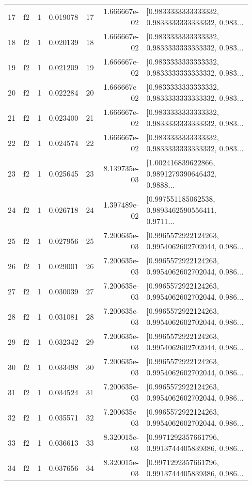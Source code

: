 \begin{tabular}{lllrlrl}
17  &  f2 &   1 &  0.019078 &   17 &  1.666667e-02 &  [0.9833333333333332, 0.9833333333333332, 0.983... \\
18  &  f2 &   1 &  0.020139 &   18 &  1.666667e-02 &  [0.9833333333333332, 0.9833333333333332, 0.983... \\
19  &  f2 &   1 &  0.021209 &   19 &  1.666667e-02 &  [0.9833333333333332, 0.9833333333333332, 0.983... \\
20  &  f2 &   1 &  0.022284 &   20 &  1.666667e-02 &  [0.9833333333333332, 0.9833333333333332, 0.983... \\
21  &  f2 &   1 &  0.023400 &   21 &  1.666667e-02 &  [0.9833333333333332, 0.9833333333333332, 0.983... \\
22  &  f2 &   1 &  0.024574 &   22 &  1.666667e-02 &  [0.9833333333333332, 0.9833333333333332, 0.983... \\
23  &  f2 &   1 &  0.025645 &   23 &  8.139735e-03 &  [1.002416839622866, 0.9891279390646432, 0.9888... \\
24  &  f2 &   1 &  0.026718 &   24 &  1.397489e-02 &  [0.997551185062538, 0.9893462590556411, 0.9711... \\
25  &  f2 &   1 &  0.027956 &   25 &  7.200635e-03 &  [0.9965572922124263, 0.9954062602702044, 0.986... \\
26  &  f2 &   1 &  0.029001 &   26 &  7.200635e-03 &  [0.9965572922124263, 0.9954062602702044, 0.986... \\
27  &  f2 &   1 &  0.030039 &   27 &  7.200635e-03 &  [0.9965572922124263, 0.9954062602702044, 0.986... \\
28  &  f2 &   1 &  0.031081 &   28 &  7.200635e-03 &  [0.9965572922124263, 0.9954062602702044, 0.986... \\
29  &  f2 &   1 &  0.032342 &   29 &  7.200635e-03 &  [0.9965572922124263, 0.9954062602702044, 0.986... \\
30  &  f2 &   1 &  0.033498 &   30 &  7.200635e-03 &  [0.9965572922124263, 0.9954062602702044, 0.986... \\
31  &  f2 &   1 &  0.034524 &   31 &  7.200635e-03 &  [0.9965572922124263, 0.9954062602702044, 0.986... \\
32  &  f2 &   1 &  0.035571 &   32 &  7.200635e-03 &  [0.9965572922124263, 0.9954062602702044, 0.986... \\
33  &  f2 &   1 &  0.036613 &   33 &  8.320015e-03 &  [0.9971292357661796, 0.9913744405839386, 0.986... \\
34  &  f2 &   1 &  0.037656 &   34 &  8.320015e-03 &  [0.9971292357661796, 0.9913744405839386, 0.986... \\

\end{tabular}
